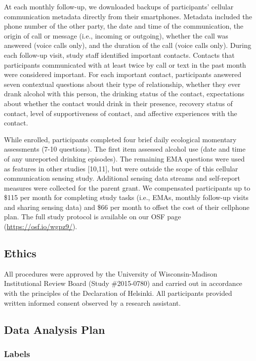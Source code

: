 \documentclass[
  letterpaper,
  DIV=11,
  numbers=noendperiod]{scrartcl}
\begin{document}
At each monthly follow-up, we downloaded backups of participants'
cellular communication metadata directly from their smartphones.
Metadata included the phone number of the other party, the date and time
of the communication, the origin of call or message (i.e., incoming or
outgoing), whether the call was answered (voice calls only), and the
duration of the call (voice calls only). During each follow-up visit,
study staff identified important contacts. Contacts that participants
communicated with at least twice by call or text in the past month were
considered important. For each important contact, participants answered
seven contextual questions about their type of relationship, whether
they ever drank alcohol with this person, the drinking status of the
contact, expectations about whether the contact would drink in their
presence, recovery status of contact, level of supportiveness of
contact, and affective experiences with the contact.

While enrolled, participants completed four brief daily ecological
momentary assessments (7-10 questions). The first item assessed alcohol
use (date and time of any unreported drinking episodes). The remaining
EMA questions were used as features in other studies {[}10,11{]}, but
were outside the scope of this cellular communication sensing study.
Additional sensing data streams and self-report measures were collected
for the parent grant. We compensated participants up to \$115 per month
for completing study tasks (i.e., EMAs, monthly follow-up visits and
sharing sensing data) and \$66 per month to offset the cost of their
cellphone plan. The full study protocol is available on our OSF page
(\url{https://osf.io/wgpz9/}).

\subsection{Ethics}\label{ethics}

All procedures were approved by the University of Wisconsin-Madison
Institutional Review Board (Study \#2015-0780) and carried out in
accordance with the principles of the Declaration of Helsinki. All
participants provided written informed consent observed by a research
assistant.

\subsection{Data Analysis Plan}\label{data-analysis-plan}

\subsubsection{Labels}\label{labels}
\end{document}
